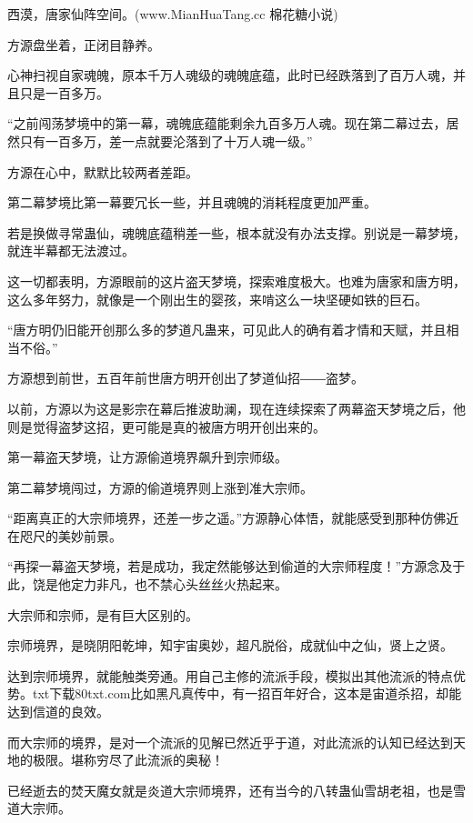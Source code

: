 
\begin{this_body}

西漠，唐家仙阵空间。(www.MianHuaTang.cc 棉花糖小说)

方源盘坐着，正闭目静养。

心神扫视自家魂魄，原本千万人魂级的魂魄底蕴，此时已经跌落到了百万人魂，并且只是一百多万。

“之前闯荡梦境中的第一幕，魂魄底蕴能剩余九百多万人魂。现在第二幕过去，居然只有一百多万，差一点就要沦落到了十万人魂一级。”

方源在心中，默默比较两者差距。

第二幕梦境比第一幕要冗长一些，并且魂魄的消耗程度更加严重。

若是换做寻常蛊仙，魂魄底蕴稍差一些，根本就没有办法支撑。别说是一幕梦境，就连半幕都无法渡过。

这一切都表明，方源眼前的这片盗天梦境，探索难度极大。也难为唐家和唐方明，这么多年努力，就像是一个刚出生的婴孩，来啃这么一块坚硬如铁的巨石。

“唐方明仍旧能开创那么多的梦道凡蛊来，可见此人的确有着才情和天赋，并且相当不俗。”

方源想到前世，五百年前世唐方明开创出了梦道仙招――盗梦。

以前，方源以为这是影宗在幕后推波助澜，现在连续探索了两幕盗天梦境之后，他则是觉得盗梦这招，更可能是真的被唐方明开创出来的。

第一幕盗天梦境，让方源偷道境界飙升到宗师级。

第二幕梦境闯过，方源的偷道境界则上涨到准大宗师。

“距离真正的大宗师境界，还差一步之遥。”方源静心体悟，就能感受到那种仿佛近在咫尺的美妙前景。

“再探一幕盗天梦境，若是成功，我定然能够达到偷道的大宗师程度！”方源念及于此，饶是他定力非凡，也不禁心头丝丝火热起来。

大宗师和宗师，是有巨大区别的。

宗师境界，是晓阴阳乾坤，知宇宙奥妙，超凡脱俗，成就仙中之仙，贤上之贤。

达到宗师境界，就能触类旁通。用自己主修的流派手段，模拟出其他流派的特点优势。txt下载80txt.com比如黑凡真传中，有一招百年好合，这本是宙道杀招，却能达到信道的良效。

而大宗师的境界，是对一个流派的见解已然近乎于道，对此流派的认知已经达到天地的极限。堪称穷尽了此流派的奥秘！

已经逝去的焚天魔女就是炎道大宗师境界，还有当今的八转蛊仙雪胡老祖，也是雪道大宗师。


\end{this_body}
